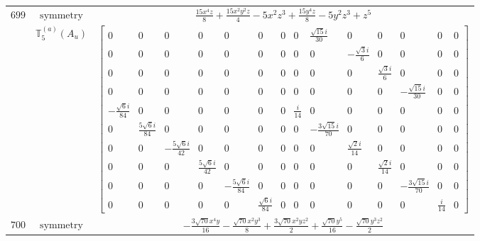 \documentclass[fleqn,8pt,landscape]{jsarticle}
\begin{document}
\begin{longtable}{ccc}
$ 699 $ & $ \text{symmetry} $ & $ \frac{15 x^{4} z}{8} + \frac{15 x^{2} y^{2} z}{4} - 5 x^{2} z^{3} + \frac{15 y^{4} z}{8} - 5 y^{2} z^{3} + z^{5} $ \\
$  $ & $ \mathbb{T}_{5}^{(a)}(A_{u}) $ & $ \begin{bmatrix} 0 & 0 & 0 & 0 & 0 & 0 & 0 & 0 & \frac{\sqrt{15} i}{30} & 0 & 0 & 0 & 0 & 0 \\ 0 & 0 & 0 & 0 & 0 & 0 & 0 & 0 & 0 & - \frac{\sqrt{3} i}{6} & 0 & 0 & 0 & 0 \\ 0 & 0 & 0 & 0 & 0 & 0 & 0 & 0 & 0 & 0 & \frac{\sqrt{3} i}{6} & 0 & 0 & 0 \\ 0 & 0 & 0 & 0 & 0 & 0 & 0 & 0 & 0 & 0 & 0 & - \frac{\sqrt{15} i}{30} & 0 & 0 \\ - \frac{\sqrt{6} i}{84} & 0 & 0 & 0 & 0 & 0 & 0 & \frac{i}{14} & 0 & 0 & 0 & 0 & 0 & 0 \\ 0 & \frac{5 \sqrt{6} i}{84} & 0 & 0 & 0 & 0 & 0 & 0 & - \frac{3 \sqrt{15} i}{70} & 0 & 0 & 0 & 0 & 0 \\ 0 & 0 & - \frac{5 \sqrt{6} i}{42} & 0 & 0 & 0 & 0 & 0 & 0 & \frac{\sqrt{2} i}{14} & 0 & 0 & 0 & 0 \\ 0 & 0 & 0 & \frac{5 \sqrt{6} i}{42} & 0 & 0 & 0 & 0 & 0 & 0 & \frac{\sqrt{2} i}{14} & 0 & 0 & 0 \\ 0 & 0 & 0 & 0 & - \frac{5 \sqrt{6} i}{84} & 0 & 0 & 0 & 0 & 0 & 0 & - \frac{3 \sqrt{15} i}{70} & 0 & 0 \\ 0 & 0 & 0 & 0 & 0 & \frac{\sqrt{6} i}{84} & 0 & 0 & 0 & 0 & 0 & 0 & \frac{i}{14} & 0 \end{bmatrix} $ \\ \hline
$ 700 $ & $ \text{symmetry} $ & $ - \frac{3 \sqrt{70} x^{4} y}{16} - \frac{\sqrt{70} x^{2} y^{3}}{8} + \frac{3 \sqrt{70} x^{2} y z^{2}}{2} + \frac{\sqrt{70} y^{5}}{16} - \frac{\sqrt{70} y^{3} z^{2}}{2} $ \\

\end{longtable}
\end{document}
